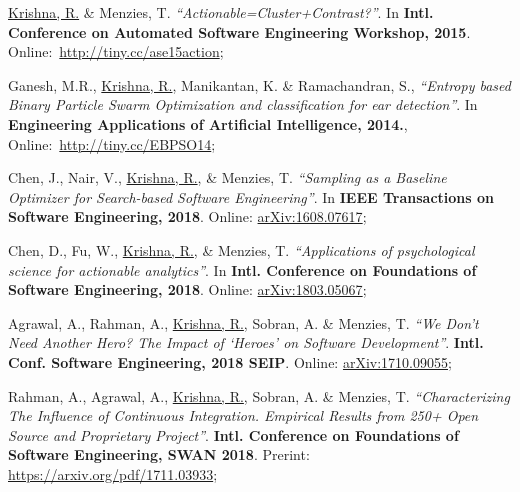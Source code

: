 \documentclass[letterpaper,9pt]{article}
\begin{document}
\begin{enumerate}[label={[\arabic*]}, leftmargin=15pt]
    \item\small \underline{Krishna, R.} \& Menzies, T. \textit{``Actionable=Cluster+Contrast?''}. In \textbf{Intl. Conference on Automated Software Engineering Workshop, 2015}. Online:~\href{http://tiny.cc/ase15action}{http://tiny.cc/ase15action}\vspace{-6pt};
    
    \item\small Ganesh, M.R., \underline{Krishna, R.}, Manikantan, K. \& Ramachandran, S., \textit{``Entropy based Binary Particle Swarm Optimization and classification for ear detection''}. In \textbf{Engineering Applications of Artificial Intelligence, 2014.}, Online:~\href{http://tiny.cc/EBPSO14}{http://tiny.cc/EBPSO14}\vspace{-6pt};
    
    \item\small Chen, J., Nair, V., \underline{Krishna, R.}, \& Menzies, T. 
    \textit{``Sampling as a Baseline Optimizer for Search-based Software 
    Engineering''}. In \textbf{IEEE Transactions on Software Engineering, 2018}. Online: 
    \href{https://arxiv.org/abs/1608.07617}{arXiv:1608.07617}\vspace{-6pt};
    
    \item\small Chen, D., Fu, W., \underline{Krishna, R.}, \& Menzies, T. \textit{``Applications of psychological science for actionable analytics''}. In \textbf{Intl. Conference on Foundations of Software Engineering, 2018}. Online: 
    \href{https://arxiv.org/abs/1803.05067}{arXiv:1803.05067}\vspace{-6pt};
    
    \item\small Agrawal, A.,  Rahman, A., \underline{Krishna, R.}, Sobran, A.
    \& Menzies, T. \textit{``We Don't Need Another Hero? The Impact of `Heroes' on Software Development''}. 
    \textbf{Intl. Conf. Software Engineering, 2018 SEIP}. Online: 
    \href{https://arxiv.org/abs/1710.09055}{arXiv:1710.09055}\vspace{-6pt};
    
    \item\small Rahman, A., Agrawal, A., \underline{Krishna, R.}, Sobran, A.
    \& Menzies, T. \textit{``Characterizing The Influence of Continuous Integration. Empirical Results from 250+ Open Source and Proprietary Project''}. 
    \textbf{Intl. Conference on Foundations of Software Engineering, SWAN 2018}. Prerint: 
    \href{https://arxiv.org/pdf/1711.03933}{https://arxiv.org/pdf/1711.03933}\vspace{-6pt};
    
    
\end{enumerate}
\end{document}

